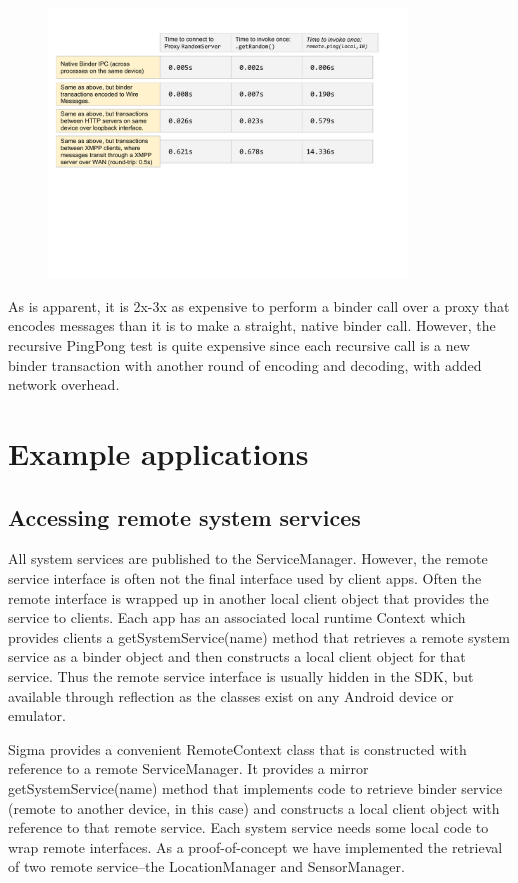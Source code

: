 \documentclass[prodmode]{acmlarge}
\begin{document}
\begin{figure}[h]
\centering
\includegraphics[width=0.85\textwidth]{drawings/Performance.pdf}
\end{figure}

As is apparent, it is 2x-3x as expensive to perform a binder call over a proxy that encodes messages than it is to make a straight, native binder call. However, the recursive PingPong test is quite expensive since each recursive call is a new binder transaction with another round of encoding and decoding, with added network overhead.

\section{Example applications}

\subsection{Accessing remote system services}
All system services are published to the ServiceManager. However, the remote service interface is often not the final interface used by client apps. Often the remote interface is wrapped up in another local client object that provides the service to clients. Each app has an associated local runtime Context which provides clients a getSystemService(name) method that retrieves a remote system service as a binder object and then constructs a local client object for that service. Thus the remote service interface is usually hidden in the SDK, but available through reflection as the classes exist on any Android device or emulator.

Sigma provides a convenient RemoteContext class that is constructed with reference to a remote ServiceManager. It provides a mirror getSystemService(name) method that implements code to retrieve binder service (remote to another device, in this case) and constructs a local client object with reference to that remote service. Each system service needs some local code to wrap remote interfaces. As a proof-of-concept we have implemented the retrieval of two remote service--the LocationManager and SensorManager.
\end{document}
